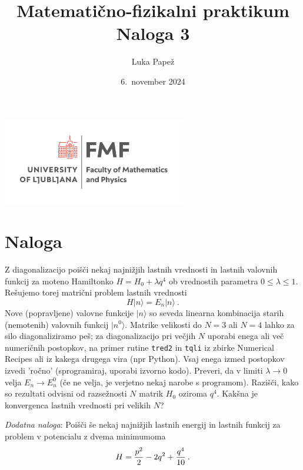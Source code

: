 \documentclass{article}
\begin{document}
\title{Matematično-fizikalni praktikum \\[3mm] \large Naloga 3}
\author{Luka Papež}
\date{6.\ november 2024}

\begin{center}
    \includegraphics[width=8cm]{logo-fmf.png}
\end{center}

{
    \let\newpage\relax
    \maketitle
}

\maketitle
\newpage
\section{Naloga}
Z diagonalizacijo poišči nekaj najnižjih lastnih
vrednosti in lastnih valovnih funkcij za moteno Hamiltonko
$H = H_0 + \lambda q^4$
ob vrednostih parametra $0\le\lambda\le 1$.  Rešujemo torej
matrični problem lastnih vrednosti
\begin{equation*}
  H | n \rangle = E_n | n \rangle \>.
\end{equation*}
Nove (popravljene) valovne funkcije $| n\rangle$ so seveda
linearna kombinacija starih (nemotenih) valovnih funkcij $| n^0\rangle$.
Matrike velikosti do $N=3$ ali $N=4$ lahko za silo diagonaliziramo peš;
za diagonalizacijo pri večjih $N$ uporabi enega ali več numeričnih postopkov,
na primer rutine {\tt tred2} in {\tt tqli}
iz zbirke Numerical Recipes ali iz kakega drugega vira (npr Python). Vsaj enega izmed
postopkov izvedi 'ročno' (sprogramiraj, uporabi izvorno kodo).  Preveri,
da v limiti $\lambda\to 0$ velja $E_n\to E_n^0$
(če ne velja, je verjetno nekaj narobe s programom).
Razišči, kako so rezultati odvisni od razsežnosti $N$ matrik
$H_0$ oziroma $q^4$.  Kakšna je konvergenca lastnih vrednosti
pri velikih $N$?

{\sl Dodatna naloga\/}: Poišči še nekaj najnižjih lastnih energij
in lastnih funkcij za problem v potencialu z dvema minimumoma
\begin{equation*}
H = {p^2\over 2} - 2q^2 + {q^4\over 10} \>.
\end{equation*}
\end{document}
